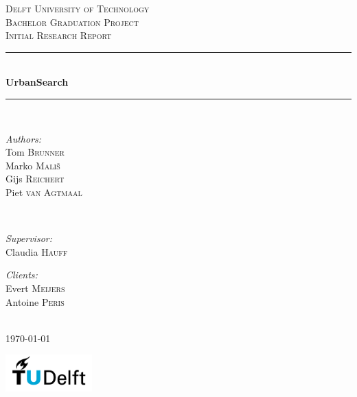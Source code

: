 \begin{titlepage}

\newcommand{\HRule}{\rule{\linewidth}{0.5mm}}

\center
 
\textsc{\LARGE Delft University of Technology}\\[1.5cm]
\textsc{\Large Bachelor Graduation Project}\\[0.5cm]
\textsc{\large Initial Research Report}\\[0.5cm]

\HRule \\[0.4cm]
{ \huge \bfseries UrbanSearch}\\[0.4cm]
\HRule \\[1.5cm]
 

\begin{minipage}{0.4\textwidth}
\begin{flushleft} \large
\emph{Authors:}\\
Tom \textsc{Brunner}\\
Marko \textsc{Mali\v{s}}\\
Gijs \textsc{Reichert}\\
Piet \textsc{van Agtmaal}\\
\end{flushleft}
\end{minipage}
~
\begin{minipage}{0.4\textwidth}
\begin{flushright} \large
\emph{Supervisor:} \\
Claudia \textsc{Hauff}

\emph{Clients:} \\
Evert \textsc{Meijers}\\
Antoine \textsc{Peris}
\end{flushright}
\end{minipage}\\[4cm]


{\large \today}\\[3cm]

\vfill

\raggedright
\includegraphics[width=0.25\textwidth]{logo}

\end{titlepage}